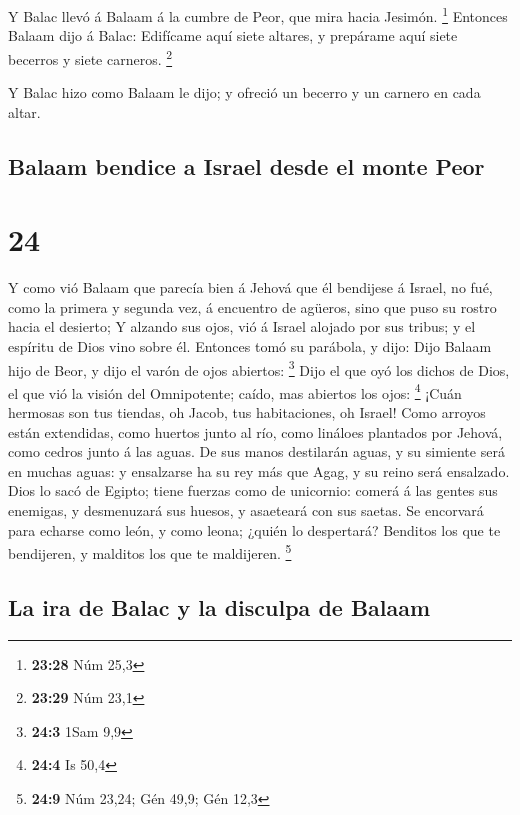  Y Balac llevó á Balaam á la cumbre de Peor, que mira
hacia Jesimón. \footnote{\textbf{23:28} Núm 25,3} 
Entonces Balaam dijo á Balac: Edifícame aquí siete altares, y prepárame
aquí siete becerros y siete carneros. \footnote{\textbf{23:29} Núm 23,1}

 Y Balac hizo como Balaam le dijo; y ofreció un becerro y
un carnero en cada altar.

\hypertarget{balaam-bendice-a-israel-desde-el-monte-peor}{%
\subsection{Balaam bendice a Israel desde el monte
Peor}\label{balaam-bendice-a-israel-desde-el-monte-peor}}

\hypertarget{section-23}{%
\section{24}\label{section-23}}

 Y como vió Balaam que parecía bien á Jehová que él
bendijese á Israel, no fué, como la primera y segunda vez, á encuentro
de agüeros, sino que puso su rostro hacia el desierto;  Y
alzando sus ojos, vió á Israel alojado por sus tribus; y el espíritu de
Dios vino sobre él.  Entonces tomó su parábola, y dijo:
Dijo Balaam hijo de Beor, y dijo el varón de ojos abiertos: \footnote{\textbf{24:3}
  1Sam 9,9}  Dijo el que oyó los dichos de Dios, el que
vió la visión del Omnipotente; caído, mas abiertos los ojos: \footnote{\textbf{24:4}
  Is 50,4}  ¡Cuán hermosas son tus tiendas, oh Jacob, tus
habitaciones, oh Israel!  Como arroyos están extendidas,
como huertos junto al río, como lináloes plantados por Jehová, como
cedros junto á las aguas.  De sus manos destilarán aguas,
y su simiente será en muchas aguas: y ensalzarse ha su rey más que Agag,
y su reino será ensalzado.  Dios lo sacó de Egipto; tiene
fuerzas como de unicornio: comerá á las gentes sus enemigas, y
desmenuzará sus huesos, y asaeteará con sus saetas.  Se
encorvará para echarse como león, y como leona; ¿quién lo despertará?
Benditos los que te bendijeren, y malditos los que te maldijeren.
\footnote{\textbf{24:9} Núm 23,24; Gén 49,9; Gén 12,3}

\hypertarget{la-ira-de-balac-y-la-disculpa-de-balaam}{%
\subsection{La ira de Balac y la disculpa de
Balaam}\label{la-ira-de-balac-y-la-disculpa-de-balaam}}

